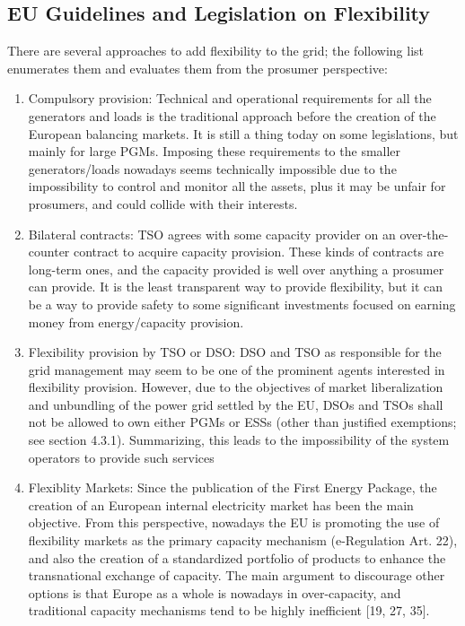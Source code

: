 \subsection{EU Guidelines and Legislation on Flexibility}
There are several approaches to add flexibility to the grid; the following list enumerates them and evaluates them from the prosumer perspective: 
\begin{enumerate}
\item Compulsory provision: Technical and operational requirements for all the generators and
loads is the traditional approach before the creation of the European balancing markets.
It is still a thing today on some legislations, but mainly for large PGMs. Imposing these requirements
to the smaller generators/loads nowadays seems technically impossible due to
the impossibility to control and monitor all the assets, plus it may be unfair for prosumers,
and could collide with their interests.
\item Bilateral contracts: TSO agrees with some capacity provider on an over-the-counter contract
to acquire capacity provision. These kinds of contracts are long-term ones, and the
capacity provided is well over anything a prosumer can provide. It is the least transparent
way to provide flexibility, but it can be a way to provide safety to some significant
investments focused on earning money from energy/capacity provision.
\item Flexibility provision by TSO or DSO: DSO and TSO as responsible for the grid management
may seem to be one of the prominent agents interested in flexibility provision.
However, due to the objectives of market liberalization and unbundling of the power grid
settled by the EU, DSOs and TSOs shall not be allowed to own either PGMs or ESSs (other
than justified exemptions; see section 4.3.1). Summarizing, this leads to the impossibility
of the system operators to provide such services
\item Flexiblity Markets: Since the publication of the First Energy Package, the creation of an
European internal electricity market has been the main objective. From this perspective,
nowadays the EU is promoting the use of flexibility markets as the primary capacity mechanism
(e-Regulation Art. 22), and also the creation of a standardized portfolio of products
to enhance the transnational exchange of capacity. The main argument to discourage other
options is that Europe as a whole is nowadays in over-capacity, and traditional capacity
mechanisms tend to be highly inefficient [19, 27, 35].
\end{enumerate}

